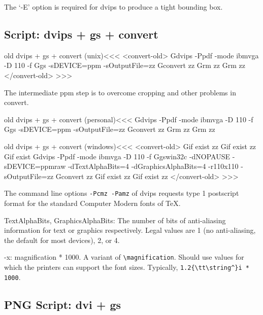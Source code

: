 \documentclass{article}
\begin{document}
The `-E' option is required for dvips to produce a tight bounding box.


\subsection{Script: dvips + gs + convert}

\<old dvips + gs + convert (unix)\><<<
<convert-old>
Gdvips -Ppdf -mode ibmvga -D 110 -f %
Ggs -sDEVICE=ppm -sOutputFile=zz%
Gconvert zz%
Grm zz%
Grm zz%
</convert-old>  >>>


The intermediate ppm step is to overcome cropping and other problems
in convert.



\<old dvips + gs + convert (personal)\><<<
Gdvips -Ppdf -mode ibmvga -D 110 -f %
Ggs -sDEVICE=ppm -sOutputFile=zz%
Gconvert zz%
Grm zz%
Grm zz%

\<old dvips + gs + convert (windows)\><<<
<convert-old>
Gif exist zz%
Gif exist zz%
Gif exist %
Gdvips -Ppdf -mode ibmvga -D 110 -f %
Ggswin32c -dNOPAUSE -sDEVICE=ppmraw -dTextAlphaBits=4 -dGraphicsAlphaBits=4 -r110x110 -sOutputFile=zz%
Gconvert zz%
Gif exist zz%
Gif exist zz%
</convert-old>   >>>

The command line options \verb'-Pcmz -Pamz' of dvips requests type 1
postscript format for the standard Computer Modern fonts of \TeX.


TextAlphaBits, GraphicsAlphaBits: The number of bits of anti-aliasing
information for text or graphics respectively. Legal values are 1 (no
anti-aliasing, the default for most devices), 2, or 4.

-x: magnification * 1000.  A variant of \verb'\magnification'. Should use
values for which the printers can support the font sizes. Typically,
\verb'1.2{\tt\string^}i * 1000'. 

\subsection{PNG Script: dvi + gs}
\end{document}
